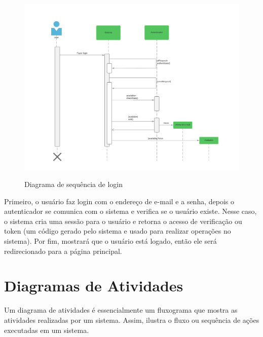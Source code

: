 \begin{figure}[H]
  \begin{center}
        \caption{Diagrama de sequência de login} \label{afp}
        \includegraphics[width=15cm]{Pictures/diagram/sequencia.png} \\


  \end{center}
\end{figure}
Primeiro, o usuário faz login com o endereço de e-mail e a senha, depois o autenticador se comunica com o sistema e verifica se o usuário existe. Nesse caso, o sistema cria uma sessão para o usuário e retorna o acesso de verificação ou token (um código gerado pelo sistema e usado para realizar operações no sistema). Por fim, mostrará que o usuário está logado, então ele será redirecionado para a página principal.
\section{Diagramas de Atividades}
Um diagrama de atividades é essencialmente um fluxograma que mostra as atividades realizadas por um sistema. Assim, ilustra o fluxo ou sequência de ações executadas em um sistema.

